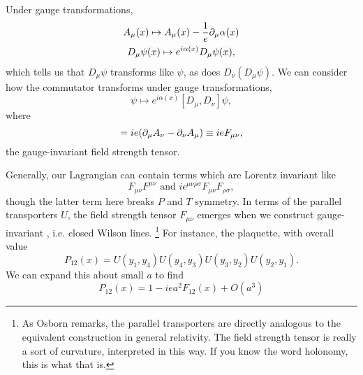 Under gauge transformations,
\begin{gather}
    A_\mu(x) \mapsto A_\mu(x) -\frac{1}{e} \partial_\mu \alpha(x)\\
    D_\mu \psi(x) \mapsto e^{i\alpha(x)}D_\mu \psi(x),
\end{gather}
which tells us that $D_\mu \psi$ transforms like $\psi$, as does $D_\nu (D_\mu \psi)$. We can consider how the commutator transforms under gauge transformations,
\begin{equation}
    [D_\mu,D_\nu]\psi \mapsto e^{i\alpha(x)} [D_\mu,D_\nu] \psi,
\end{equation}
where
\begin{equation}
    [D_\mu,D_\nu]=ie(\p_\mu A_\nu - \p_\nu A_\mu)\equiv ie F_{\mu\nu},
\end{equation}
the gauge-invariant field strength tensor.

Generally, our Lagrangian can contain terms which are Lorentz invariant like
\begin{equation}
    F_{\mu\nu} F^{\mu\nu}\text{ and } i\epsilon^{\mu\nu\rho\sigma} F_{\mu\nu} F_{\rho\sigma},
\end{equation}
though the latter term here breaks $P$ and $T$ symmetry. In terms of the parallel transporters $U$, the field strength tensor $F_{\mu\nu}$ emerges when we construct gauge-invariant , i.e. closed Wilson lines.%
    \footnote{As Osborn remarks, the parallel transporters are directly analogous to the equivalent construction in general relativity. The field strength tensor is really a sort of curvature, interpreted in this way. If you know the word holonomy, this is what that is.}
For instance, the plaquette, with overall value
\begin{equation}
    P_{12}(x)=U(y_1,y_4)U(y_4,y_3) U(y_3,y_2) U(y_2,y_1).
\end{equation}
We can expand this about small $a$ to find
\begin{equation}
    P_{12}(x)=1-iea^2 F_{12}(x)+ O(a^3)
\end{equation}

